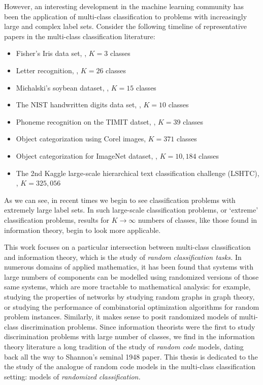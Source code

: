 However, an interesting development in the machine learning community
has been the application of multi-class classification to problems
with increasingly large and complex label sets.  Consider the
following timeline of representative papers in the multi-class
classification literature:
\begin{itemize}
\item Fisher's Iris data set, \cite{fisher1936use}, $K = 3$ classes
\item Letter recognition, \cite{frey1991letter}, $K = 26$ classes
\item Michalski's soybean dataset, \cite{mickalstd1980learning}, $K = 15$ classes
\item The NIST handwritten digits data set, \cite{grother1995nist}, $K = 10$ classes
\item Phoneme recognition on the TIMIT datset, \cite{clarkson1999use}, $K = 39$ classes
\item Object categorization using Corel images, \cite{duygulu2002object} $K = 371$ classes
\item Object categorization for ImageNet dataset, \cite{deng2010does}, $K = 10,184$ classes
\item The 2nd Kaggle large-scale hierarchical text classification challenge (LSHTC), \cite{partalas2015lshtc}, $K = 325,056$
\end{itemize}
As we can see, in recent times we begin to see classification problems
with extremely large label sets.  In such large-scale classification
problems, or `extreme' classification problems, results for $K \to
\infty$ numbers of classes, like those found in information theory,
begin to look more applicable.

This work focuses on a particular intersection between multi-class
classification and information theory, which is the study of
\emph{random classification tasks.}  In numerous domains of applied
mathematics, it has been found that systems with large numbers of
components can be modelled using randomized versions of those same
systems, which are more tractable to mathematical analysis: for
example, studying the properties of networks by studying random graphs
in graph theory, or studying the performance of combinatorial
optimization algorithms for random problem instances.  Similarly, it
makes sense to posit randomized models of multi-class discrimination
problems.  Since information theorists were the first to study
discrimination problems with large number of classes, we find in the
information theory literature a long tradition of the study of
\emph{random code} models, dating back all the way to Shannon's
seminal 1948 paper.  This thesis is dedicated to the the study of the
analogue of random code models in the multi-class classification
setting: models of \emph{randomized classification.}


